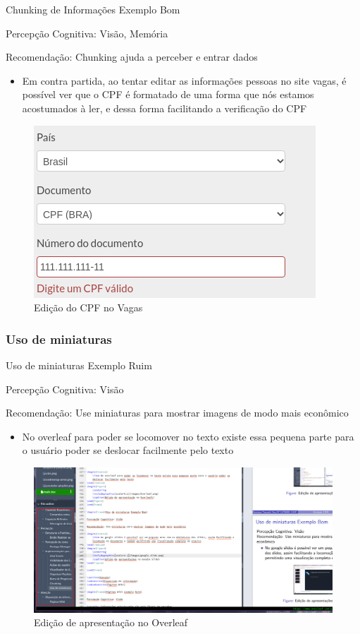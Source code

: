 \documentclass{beamer}
\begin{document}
\begin{frame}{Chunking de Informações Exemplo Bom}

Percepção Cognitiva: Visão, Memória

Recomendação: Chunking ajuda a perceber e entrar dados

\begin{itemize}
    \item Em contra partida, ao tentar editar as informações pessoas no site vagas, é possível ver que o CPF é formatado de uma forma que nós estamos acostumados à ler, e dessa forma facilitando a verificação do CPF
\end{itemize}
\begin{figure}
    \centering
    \includegraphics[scale=0.3]{images/Vagas.png}
    \caption{Edição do CPF no Vagas}
\end{figure}

\end{frame}

\subsubsection{Uso de miniaturas}
\begin{frame}{Uso de miniaturas Exemplo Ruim}

Percepção Cognitiva: Visão

Recomendação: Use miniaturas para mostrar imagens de modo mais econômico

\begin{itemize}
    \item No overleaf para poder se locomover no texto existe essa pequena parte para o usuário poder se deslocar facilmente pelo texto
\end{itemize}
\begin{figure}
    \centering
    \includegraphics[scale=0.1]{images/Overleaf.png}
    \caption{Edição de apresentação no Overleaf}
\end{figure}
\end{frame}
\end{document}
